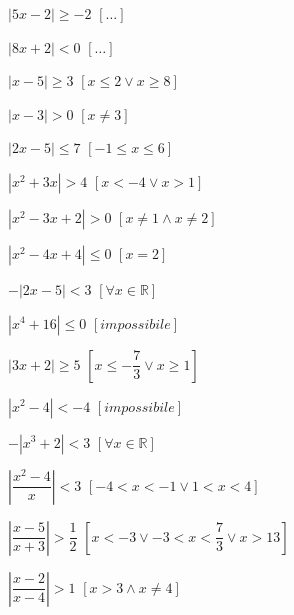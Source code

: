 \begin{esercizio}
\begin{multicols}{2}
\begin{enumeratea}
\item \(\left| 5x-2\right| \geq -2 \) \hfill \(\left[ \dots \right] \)
\item \(\left| 8x+2\right| < 0 \) \hfill \(\left[ \dots \right] \)
\item \(\left| x-5\right| \geq 3 \) \hfill \(\left[ x\leq 2 \vee x\geq 8 
\right] \)
\item \(\left| x-3\right| >0 \) \hfill \(\left[ x\neq 3 \right] \)
\item \(\left| 2x-5\right| \leq 7 \) \hfill \(\left[ -1\leq x \leq 6 \right] \)
\item \(\left| x^2+3x\right| >4 \) \hfill \(\left[ x<-4 \vee x>1 \right] \)
\item \(\left| x^2-3x+2\right| >0 \) \hfill \(\left[ x\neq 1 \wedge x\neq 2 
\right] 
\)
\item \(\left| x^2-4x+4\right| \leq 0 \) \hfill \(\left[ x=2 \right] \)
\item \(-\left| 2x-5\right| <3 \) \hfill \(\left[ \forall x \in \mathbb{R} 
\right] 
\)
\item \(\left| x^4+16\right| \leq 0 \) \hfill \(\left[ impossibile \right] \)
\item \(\left| 3x+2\right| \geq 5 \) \hfill \(\left[ x\leq -\dfrac{7}{3} \vee 
x\geq 
1 \right] \)
\item \(\left| x^2-4\right| <-4 \) \hfill \(\left[ impossibile \right] \)
\item \(-\left| x^3+2\right| <3 \) \hfill \(\left[ \forall x \in \mathbb{R} 
\right] 
\)
\item \(\left| \dfrac{x^2-4}{x}\right| <3 \) \hfill \(\left[ -4<x<-1 \vee 
1<x<4 
\right] \)
\item \(\left| \dfrac{x-5}{x+3}\right| >\dfrac{1}{2} \) \hfill \(\left[x<-3 
\vee 
-3<x<\dfrac{7}{3} \vee x>13 \right] \)
\item \(\left| \dfrac{x-2}{x-4}\right| >1 \) \hfill \(\left[x>3 \wedge x \neq 
4 
\right] \)
\end{enumeratea}
\end{multicols}
\end{esercizio}


